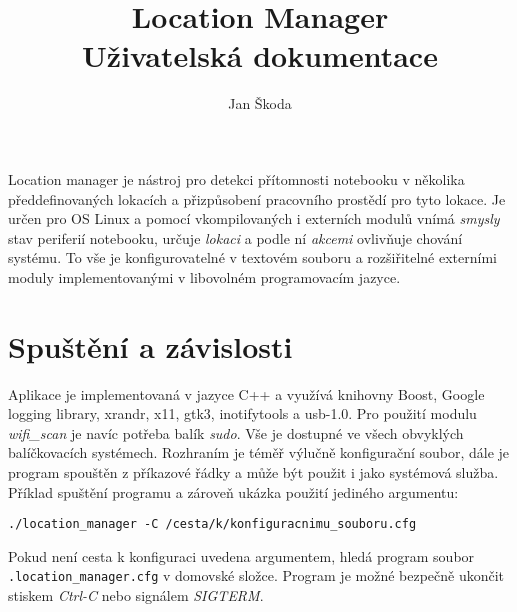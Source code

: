 \documentclass[10pt,a4paper]{article}
\author{Jan Škoda}
\title{Location Manager \\ Uživatelská dokumentace}
\begin{document}
\maketitle

\pagestyle{empty}
Location manager je nástroj pro detekci přítomnosti notebooku v několika předdefinovaných lokacích a přizpůsobení pracovního prostědí pro tyto lokace. Je určen pro OS Linux a pomocí vkompilovaných i externích modulů vnímá \textit{smysly} stav periferií notebooku, určuje \textit{lokaci} a podle ní \textit{akcemi} ovlivňuje chování systému. To vše je konfigurovatelné v textovém souboru a rozšiřitelné externími moduly implementovanými v libovolném programovacím jazyce.

\section*{Spuštění a závislosti}
Aplikace je implementovaná v jazyce C++ a využívá knihovny Boost, Google logging library, xrandr, x11, gtk3, inotifytools a usb-1.0. Pro použití modulu \textit{wifi\_scan} je navíc potřeba balík \textit{sudo}. Vše je dostupné ve všech obvyklých balíčkovacích systémech. Rozhraním je téměř výlučně konfigurační soubor, dále je program spouštěn z příkazové řádky a může být použit i jako systémová služba. Příklad spuštění programu a zároveň ukázka použití jediného argumentu:
\begin{verbatim}
./location_manager -C /cesta/k/konfiguracnimu_souboru.cfg
\end{verbatim}
Pokud není cesta k konfiguraci uvedena argumentem, hledá program soubor \texttt{.location\_manager.cfg} v domovské složce. Program je možné bezpečně ukončit stiskem \textit{Ctrl-C} nebo signálem \textit{SIGTERM}.
\end{document}
